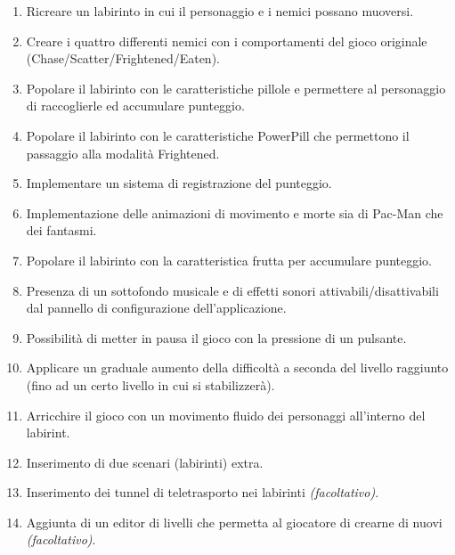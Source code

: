 \documentclass[12pt,a4paper]{report}
\begin{document}
\begin{enumerate}
  \item Ricreare un labirinto in cui il personaggio e i nemici possano muoversi.
  \item Creare i quattro differenti nemici con i comportamenti del gioco originale (Chase/Scatter/Frightened/Eaten).
  \item Popolare il labirinto con le caratteristiche pillole e permettere al personaggio di raccoglierle ed accumulare punteggio.
  \item Popolare il labirinto con le caratteristiche PowerPill che permettono il passaggio alla modalità Frightened.
  \item Implementare un sistema di registrazione del punteggio.
  \item Implementazione delle animazioni di movimento e morte sia di Pac-Man che dei fantasmi.
  \item Popolare il labirinto con la caratteristica frutta per accumulare punteggio.
  \item Presenza di un sottofondo musicale e di effetti sonori attivabili/disattivabili dal pannello di configurazione dell’applicazione.
  \item Possibilità di metter in pausa il gioco con la pressione di un pulsante.
  \item Applicare un graduale aumento della difficoltà a seconda del livello raggiunto (fino ad un certo livello in cui si stabilizzerà).
  \item Arricchire il gioco con un movimento fluido dei personaggi all'interno del labirint.
  \item Inserimento di due scenari (labirinti) extra.
  \item Inserimento dei tunnel di teletrasporto nei labirinti \textit{(facoltativo)}.
  \item Aggiunta di un editor di livelli che permetta al giocatore di crearne di nuovi \textit{(facoltativo)}.
\end{enumerate}

%
%
\end{document}
